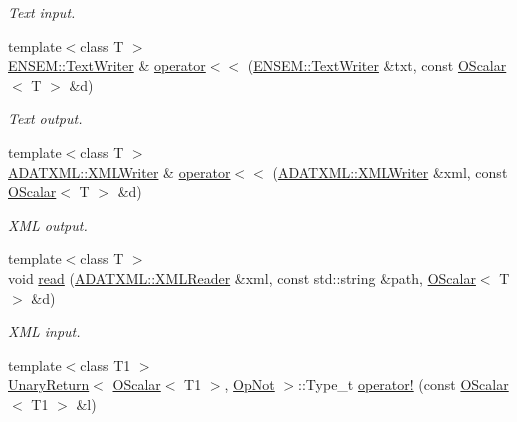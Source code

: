 \begin{DoxyCompactItemize}
\begin{DoxyCompactList}\small\item\em Text input. \end{DoxyCompactList}\item 
{\footnotesize template$<$class T $>$ }\\\mbox{\hyperlink{classENSEM_1_1TextWriter}{E\+N\+S\+E\+M\+::\+Text\+Writer}} \& \mbox{\hyperlink{group__obsscalar_gaa7ba73cd5fa56a8fc62b9f9297fbef31}{operator$<$$<$}} (\mbox{\hyperlink{classENSEM_1_1TextWriter}{E\+N\+S\+E\+M\+::\+Text\+Writer}} \&txt, const \mbox{\hyperlink{classENSEM_1_1OScalar}{O\+Scalar}}$<$ T $>$ \&d)
\begin{DoxyCompactList}\small\item\em Text output. \end{DoxyCompactList}\item 
{\footnotesize template$<$class T $>$ }\\\mbox{\hyperlink{classADATXML_1_1XMLWriter}{A\+D\+A\+T\+X\+M\+L\+::\+X\+M\+L\+Writer}} \& \mbox{\hyperlink{group__obsscalar_ga2eb6bed5bd0b7f67a0a0641033b3a120}{operator$<$$<$}} (\mbox{\hyperlink{classADATXML_1_1XMLWriter}{A\+D\+A\+T\+X\+M\+L\+::\+X\+M\+L\+Writer}} \&xml, const \mbox{\hyperlink{classENSEM_1_1OScalar}{O\+Scalar}}$<$ T $>$ \&d)
\begin{DoxyCompactList}\small\item\em X\+ML output. \end{DoxyCompactList}\item 
{\footnotesize template$<$class T $>$ }\\void \mbox{\hyperlink{group__obsscalar_ga8844f89649f50b51ab6ae9f43064458c}{read}} (\mbox{\hyperlink{classADATXML_1_1XMLReader}{A\+D\+A\+T\+X\+M\+L\+::\+X\+M\+L\+Reader}} \&xml, const std\+::string \&path, \mbox{\hyperlink{classENSEM_1_1OScalar}{O\+Scalar}}$<$ T $>$ \&d)
\begin{DoxyCompactList}\small\item\em X\+ML input. \end{DoxyCompactList}\item 
{\footnotesize template$<$class T1 $>$ }\\\mbox{\hyperlink{structENSEM_1_1UnaryReturn}{Unary\+Return}}$<$ \mbox{\hyperlink{classENSEM_1_1OScalar}{O\+Scalar}}$<$ T1 $>$, \mbox{\hyperlink{structENSEM_1_1OpNot}{Op\+Not}} $>$\+::Type\+\_\+t \mbox{\hyperlink{group__obsscalar_gaa78e8f77d7f0b9803c015de6cc93c228}{operator!}} (const \mbox{\hyperlink{classENSEM_1_1OScalar}{O\+Scalar}}$<$ T1 $>$ \&l)
\item 

\end{DoxyCompactItemize}
